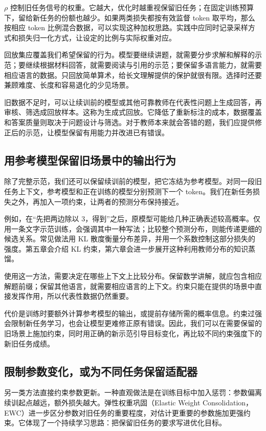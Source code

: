 $\rho$ 控制旧任务信号的权重。它越大，优化时越重视保留旧任务；在固定训练预算下，留给新任务的份额也越少。如果两类损失都按有效监督 token 取平均，那么按相应 token 比例混合数据，可以实现这种加权思路。实践中应同时记录采样方式和损失归一化方式，让设定的比例与实际权重对应。

回放集应覆盖我们希望保留的行为。模型要继续讲题，就需要分步求解和解释的示范；要继续根据材料回答，就需要阅读与引用的示范；要保留多语言能力，就需要相应语言的数据。只回放简单算术，给长文理解提供的保护就很有限。选择时还要兼顾难度、长度和容易退化的少见场景。

旧数据不足时，可以让续训前的模型或其他可靠教师在代表性问题上生成回答，再审核、筛选成回放样本。这称为生成式回放。它降低了重新标注的成本，数据覆盖和答案质量则取决于问题设计与筛选。对于教师本来就会答错的题，我们应提供修正后的示范，让模型保留有用能力并改进已有错误。

\subsection{用参考模型保留旧场景中的输出行为}

除了完整示范，我们还可以保留续训前的模型，把它冻结为参考模型。对同一段旧任务上下文，参考模型和正在训练的模型分别预测下一个 token。我们在新任务损失之外，再加入一项约束，让两者的预测分布保持接近。

例如，在“先把两边除以 3，得到”之后，原模型可能给几种正确表述较高概率。仅用一条文字示范训练，会强调其中一种写法；比较整个预测分布，则能传递更细的候选关系。常见做法用 KL 散度衡量分布差异，并用一个系数控制这部分损失的强度。第五章会介绍 KL 约束，第六章会进一步展开这种利用教师分布的知识蒸馏。

使用这一方法，需要决定在哪些上下文上比较分布。保留数学讲解，就应包含相应解题前缀；保留其他语言，就需要相应语言的上下文。约束只能在提供的场景中直接发挥作用，所以代表性数据仍然重要。

代价是训练时要额外计算参考模型的输出，或提前存储所需的概率信息。约束过强会限制新任务学习，也会让模型更难修正原有错误。因此，我们可以在需要保留的旧场景上施加约束，同时用正确的新示范引导目标变化，再比较不同约束强度下的新旧任务成绩。

\subsection{限制参数变化，或为不同任务保留适配器}

另一类方法直接约束参数更新。一种直观做法是在训练目标中加入惩罚：参数偏离续训起点越远，额外损失越大。弹性权重巩固（Elastic Weight Consolidation，EWC）进一步区分参数对旧任务的重要程度，对估计更重要的参数施加更强约束。它体现了一个持续学习思路：把保留旧任务的要求写进优化目标。

